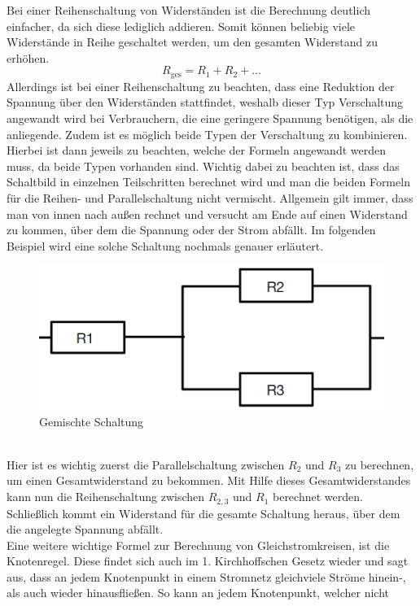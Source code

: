 Bei einer Reihenschaltung von Widerständen ist die Berechnung deutlich einfacher, da sich diese lediglich addieren. Somit können beliebig viele Widerstände in Reihe geschaltet werden, um den gesamten Widerstand zu erhöhen.
\begin{equation}
R_{\text{ges}}=R_1+R_2+\dots
\label{eqn:Widerstand Reihenschaltung}
\end{equation}
Allerdings ist bei einer Reihenschaltung zu beachten, dass eine Reduktion der Spannung über den Widerständen stattfindet, weshalb dieser Typ Verschaltung 
angewandt wird bei Verbrauchern, die eine geringere Spannung benötigen, als die anliegende. Zudem ist es möglich beide Typen der Verschaltung zu kombinieren. 
Hierbei ist dann jeweils zu beachten, welche der Formeln angewandt werden muss, da beide Typen vorhanden sind. Wichtig dabei zu beachten ist, dass das 
Schaltbild in einzelnen Teilschritten berechnet wird und man die beiden Formeln für die Reihen- und Parallelschaltung nicht vermischt. 
Allgemein gilt immer, dass man von innen nach außen rechnet und versucht am Ende auf einen Widerstand zu kommen, über dem die Spannung oder der Strom abfällt.
Im folgenden Beispiel wird eine solche Schaltung nochmals genauer erläutert.
\begin{figure}[hbt]
    \centering
    \includegraphics[width=0.8\linewidth]{images/Gemischte Schaltung}
    \caption[Gemischte Schaltung]{Gemischte Schaltung}
    \label{fig:Gemischte Schaltung}
\end{figure}
\\Hier ist es wichtig zuerst die Parallelschaltung zwischen $R_2$ und $R_3$ zu berechnen, um einen Gesamtwiderstand zu bekommen. Mit Hilfe dieses 
Gesamtwiderstandes kann nun die Reihenschaltung zwischen $R_{2,3}$ und $R_1$ berechnet werden. Schließlich kommt ein Widerstand für die gesamte Schaltung
heraus, über dem die angelegte Spannung abfällt.\\
Eine weitere wichtige Formel zur Berechnung von Gleichstromkreisen, ist die Knotenregel. Diese findet sich auch im 1. Kirchhoffschen Gesetz wieder und sagt 
aus, dass an jedem Knotenpunkt in einem Stromnetz gleichviele Ströme hinein-, als auch wieder hinausfließen. So kann an jedem Knotenpunkt, welcher nicht 
